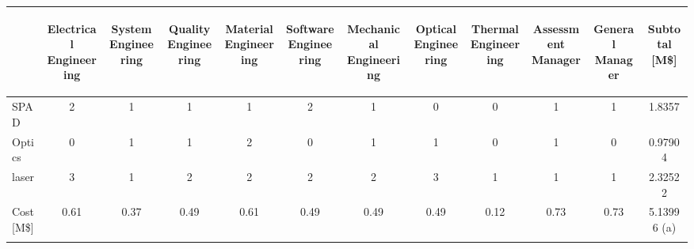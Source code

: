 \begin{table}[ht!]
\centering
\begin{tabular}{p{0.9in}|cccccccccc||c}
&\begin{sideways}Electrical Engineering\end{sideways} 
&\begin{sideways}System Engineering\end {sideways} 
&\begin{sideways}Quality Engineering\end{sideways} 
&\begin{sideways}Material Engineering\end{sideways} 
&\begin{sideways}Software Engineering\end{sideways} 
&\begin{sideways}Mechanical Engineering\end{sideways} 
&\begin{sideways}Optical Engineering\end{sideways} 
&\begin{sideways}Thermal Engineering\end{sideways}
&\begin{sideways}Assessment Manager\end{sideways}
&\begin{sideways}General Manager\end{sideways}
&\begin{sideways}\textbf{Subtotal [M\$]}\end{sideways}\\\hline
\acs{SPAD} &2 &1 &1 &1 &2 &1 &0 &0 &1 &1 &1.8357 \\
Optics &0 &1 &1 &2 &0 &1 &1 &0 &1 &0 &0.97904 \\
\acs{laser} &3 &1 &2 &2 &2 &2 &3 &1 &1 &1 &2.32522 \\ \hline \hline 
Cost [M\$] &0.61 &0.37 &0.49 &0.61 &0.49 &0.49 &0.49 &0.12 &0.73 &0.73 &5.13996 (a) \\\hline\hline\\


\end{tabular}
\end{table}
